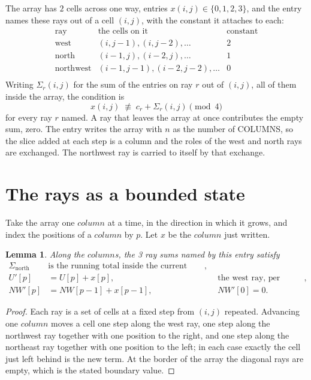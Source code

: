 \documentclass[11pt,a4paper]{article}
\theoremstyle{plain}
\newtheorem{lemma}[theorem]{Lemma}
\theoremstyle{definition}
\begin{document}
The array has $2$ cells across one way, entries $x(i,j)\in\{0,1,2,3\}$, and the entry names these
rays out of a cell $(i,j)$, with the constant it attaches to each:
\[
\begin{array}{lll}
\text{ray} & \text{the cells on it} & \text{constant} \\[2pt]
\text{west} & (i,j-1),(i,j-2),\dots & 2 \\
\text{north} & (i-1,j),(i-2,j),\dots & 1 \\
\text{northwest} & (i-1,j-1),(i-2,j-2),\dots & 0 \\
\end{array}
\]
Writing $\Sigma_r(i,j)$ for the sum of the entries on ray $r$ out of $(i,j)$, all of them
inside the array, the condition is
\[
x(i,j)\;\not\equiv\;c_r+\Sigma_r(i,j) \pmod{4}
\]
for every ray $r$ named. A ray that leaves the array at once contributes the empty sum,
zero. The entry writes the array with $n$ as the number of COLUMNS, so the slice added at each step is a column and the roles of the west and north rays are exchanged. The northwest ray is carried to itself by that exchange.

\section{The rays as a bounded state}

Take the array one $column$ at a time, in the direction in which it grows, and index the
positions of a $column $ by $p$. Let $x$ be the $column$ just written.

\begin{lemma}\label{lem:rays}
Along the $column$s, the 3 ray sums named by this entry satisfy
\[
\begin{aligned}
\Sigma_{\mathrm{north}}\ &\text{is the running total inside the current column},\\
U'[p]&=U[p]+x[p], &&\text{the west ray, per position},\\
NW'[p]&=NW[p-1]+x[p-1], && NW'[0]=0 .
\end{aligned}
\]
\end{lemma}

\begin{proof}
Each ray is a set of cells at a fixed step from $(i,j)$ repeated. Advancing one $column$
moves a cell one step along the west ray, one step along the northwest ray together with one
position to the right, and one step along the northeast ray together with one position to the
left; in each case exactly the cell just left behind is the new term. At the border of the
array the diagonal rays are empty, which is the stated boundary value.
\end{proof}
\end{document}
